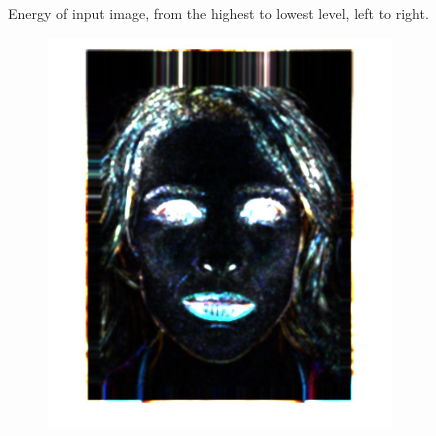 \documentclass[a4paper]{iacas}
\begin{document}
\begin{figure}[!htbp]
	\caption{Energy of input image, from the highest to lowest level, left to right.}
	\label{fig:150}
\end{figure}

\begin{figure}[!htbp]
	
	\begin{subfigure}[b]{0.15\textwidth}
		\includegraphics[width=\textwidth]{101.jpg}
		\caption{}
		\label{fig:101}
	\end{subfigure}
	\begin{subfigure}[b]{0.15\textwidth}

\end{subfigure}
\end{figure}
\end{document}
